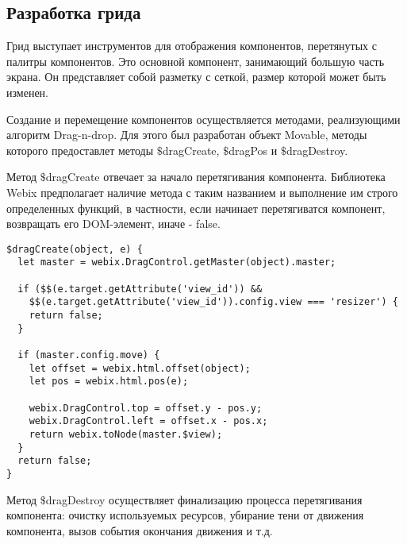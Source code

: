 \subsection{Разработка грида}
\label{sec:development:grid}

Грид выступает инструментов для отображения компонентов, перетянутых с палитры компонентов. Это основной компонент, занимающий большую часть экрана. Он представляет собой разметку с сеткой, размер которой может быть изменен.

Создание и перемещение компонентов осуществляется методами, реализующими алгоритм Drag-n-drop. Для этого был разработан объект Movable, методы которого предоставлет методы $\$$dragCreate, $\$$dragPos и $\$$dragDestroy.

Метод $\$$dragCreate отвечает за начало перетягивания компонента. Библиотека Webix предполагает наличие метода с таким названием и выполнение им строго определенных функций, в частности, если начинает перетягиватся компонент, возвращать его DOM-элемент, иначе - false.

\begin{lstlisting}
$dragCreate(object, e) {
  let master = webix.DragControl.getMaster(object).master;

  if ($$(e.target.getAttribute('view_id')) &&
    $$(e.target.getAttribute('view_id')).config.view === 'resizer') {
    return false;
  }

  if (master.config.move) {
    let offset = webix.html.offset(object);
    let pos = webix.html.pos(e);

    webix.DragControl.top = offset.y - pos.y;
    webix.DragControl.left = offset.x - pos.x;
    return webix.toNode(master.$view);
  }
  return false;
}
\end{lstlisting}

Метод $\$$dragDestroy осуществляет финализацию процесса перетягивания компонента: очистку используемых ресурсов, убирание тени от движения компонента, вызов события окончания движения и т.д.

